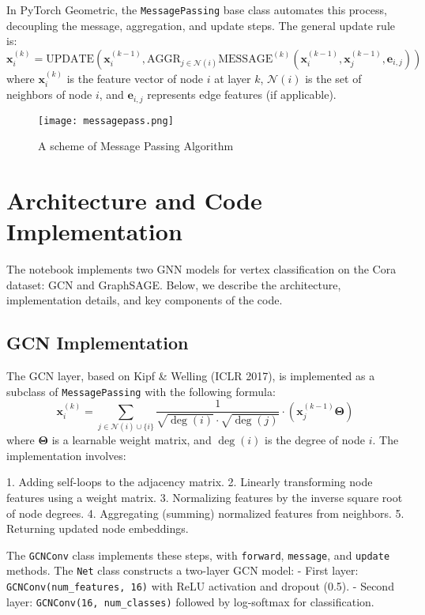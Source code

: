 \documentclass{article}
\begin{document}
In PyTorch Geometric, the \texttt{MessagePassing} base class automates this process, decoupling the message, aggregation, and update steps. The general update rule is:
\[
\mathbf{x}_i^{(k)} = \mathrm{UPDATE} \left( \mathbf{x}_i^{(k-1)}, \mathrm{AGGR}_{j \in \mathcal{N}(i)} \mathrm{MESSAGE}^{(k)}\left(\mathbf{x}_i^{(k-1)}, \mathbf{x}_j^{(k-1)}, \mathbf{e}_{i,j}\right) \right)
\]
where \(\mathbf{x}_i^{(k)}\) is the feature vector of node \(i\) at layer \(k\), \(\mathcal{N}(i)\) is the set of neighbors of node \(i\), and \(\mathbf{e}_{i,j}\) represents edge features (if applicable).


\begin{figure}[h] %
    \centering
    \texttt{[image: messagepass.png]} %
    \caption{A scheme of Message Passing Algorithm} %
    \label{fig:example} %
\end{figure}

\section*{Architecture and Code Implementation}
The notebook implements two GNN models for vertex classification on the Cora dataset: GCN and GraphSAGE. Below, we describe the architecture, implementation details, and key components of the code.

\subsection*{GCN Implementation}
The GCN layer, based on Kipf \& Welling (ICLR 2017), is implemented as a subclass of \texttt{MessagePassing} with the following formula:
\[
\mathbf{x}_i^{(k)} = \sum_{j \in \mathcal{N}(i) \cup \{i\}} \frac{1}{\sqrt{\deg(i)} \cdot \sqrt{\deg(j)}} \cdot \left( \mathbf{x}_j^{(k-1)} \mathbf{\Theta} \right)
\]
where \(\mathbf{\Theta}\) is a learnable weight matrix, and \(\deg(i)\) is the degree of node \(i\). The implementation involves:

1. Adding self-loops to the adjacency matrix.
2. Linearly transforming node features using a weight matrix.
3. Normalizing features by the inverse square root of node degrees.
4. Aggregating (summing) normalized features from neighbors.
5. Returning updated node embeddings.

The \texttt{GCNConv} class implements these steps, with \texttt{forward}, \texttt{message}, and \texttt{update} methods. The \texttt{Net} class constructs a two-layer GCN model:
- First layer: \texttt{GCNConv(num\_features, 16)} with ReLU activation and dropout (0.5).
- Second layer: \texttt{GCNConv(16, num\_classes)} followed by log-softmax for classification.
\end{document}
